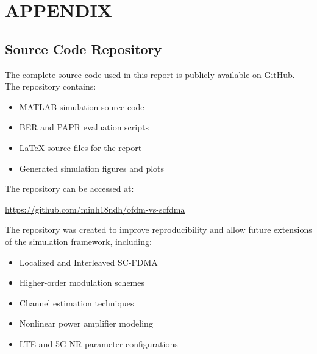 \newpage
\section*{APPENDIX}
{}

\subsection*{Source Code Repository}

The complete source code used in this report is publicly available on
GitHub. The repository contains:

\begin{itemize}
    \item MATLAB simulation source code
    \item BER and PAPR evaluation scripts
    \item LaTeX source files for the report
    \item Generated simulation figures and plots
\end{itemize}

The repository can be accessed at:

\vspace{0.3cm}

\noindent
\url{https://github.com/minh18ndh/ofdm-vs-scfdma}

\vspace{0.3cm}

\vspace{0.5cm}

The repository was created to improve reproducibility and allow future
extensions of the simulation framework, including:

\begin{itemize}
    \item Localized and Interleaved SC-FDMA
    \item Higher-order modulation schemes
    \item Channel estimation techniques
    \item Nonlinear power amplifier modeling
    \item LTE and 5G NR parameter configurations
\end{itemize}
